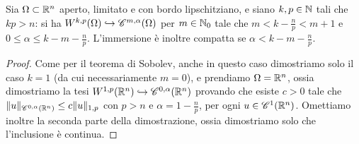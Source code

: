 \begin{teorema}[Morrey] \label{t:morrey}
    Sia $\Omega\subset\R^n$ aperto, limitato e con bordo lipschitziano, e siano $k,p\in\N$ tali che $kp>n$: si ha $\sobW[k,p]{\Omega}\emb\cont[m,\alpha]{\Omega}$ per $m\in\N_0$ tale che $m<k-\frac{n}{p}<m+1$ e $0\le\alpha\le k-m-\frac{n}{p}$.
    L'immersione è inoltre compatta se $\alpha<k-m-\frac{n}{p}$.
\end{teorema}
\begin{proof}
    Come per il teorema di Sobolev, anche in questo caso dimostriamo solo il caso $k=1$ (da cui necessariamente $m=0$), e prendiamo $\Omega=\R^n$, ossia dimostriamo la tesi $\sobW[1,p]{\R^n}\emb\cont[0,\alpha]{\R^n}$ provando che esiste $c>0$ tale che $\norm{u}_{\cont[0,\alpha]{\R^n}}\le c\norm{u}_{1,p}$ con $p>n$ e $\alpha=1-\frac{n}{p}$, per ogni $u\in\cont[1]{\R^n}$.
    Omettiamo inoltre la seconda parte della dimostrazione, ossia dimostriamo solo che l'inclusione è continua.


\end{proof}
